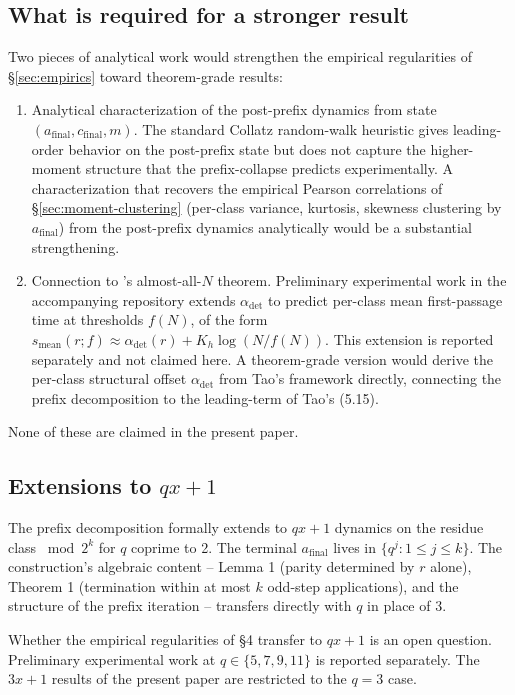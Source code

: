 \documentclass[pdflatex,sn-mathphys-num]{sn-jnl}
\theoremstyle{thmstyleone}%
\theoremstyle{definition}
\theoremstyle{plain}
\begin{document}
\subsection{What is required for a stronger result}
Two pieces of analytical work would strengthen the empirical regularities of \S\ref{sec:empirics} toward theorem-grade results:
\begin{enumerate}
    \item Analytical characterization of the post-prefix dynamics from state $(a_{\text{final}}, c_{\text{final}}, m)$. The standard Collatz random-walk heuristic gives leading-order behavior on the post-prefix state but does not capture the higher-moment structure that the prefix-collapse predicts experimentally. A characterization that recovers the empirical Pearson correlations of \S\ref{sec:moment-clustering} (per-class variance, kurtosis, skewness clustering by $a_{\text{final}}$) from the post-prefix dynamics analytically would be a substantial strengthening.
    \item Connection to \citep{tao2022}'s almost-all-$N$ theorem. Preliminary experimental work in the accompanying repository extends $\alpha_{\text{det}}$ to predict per-class mean first-passage time at thresholds $f(N)$, of the form $s_{\text{mean}}(r; f) \approx \alpha_{\text{det}}(r) + K_h \log(N / f(N))$. This extension is reported separately and not claimed here. A theorem-grade version would derive the per-class structural offset $\alpha_{\text{det}}$ from Tao's framework directly, connecting the prefix decomposition to the leading-term of Tao's (5.15).
\end{enumerate}

None of these are claimed in the present paper.

\subsection{Extensions to $qx+1$}
The prefix decomposition formally extends to $qx+1$ dynamics on the residue class $\bmod 2^k$ for $q$ coprime to 2. The terminal $a_{\text{final}}$ lives in $\{ q^j : 1 \leq j \leq k \}$. The construction's algebraic content -- Lemma 1 (parity determined by $r$ alone), Theorem 1 (termination within at most $k$ odd-step applications), and the structure of the prefix iteration -- transfers directly with $q$ in place of $3$.

Whether the empirical regularities of \S4 transfer to $qx+1$ is an open question. Preliminary experimental work at $q \in \{5, 7, 9, 11\}$ is reported separately. The $3x+1$ results of the present paper are restricted to the $q=3$ case.
\end{document}
